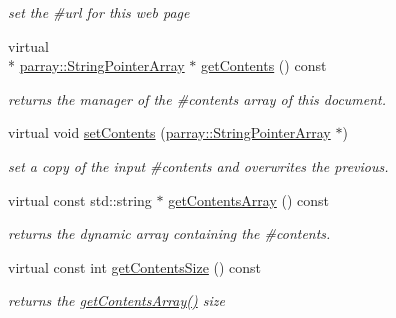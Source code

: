 \begin{DoxyCompactItemize}
\begin{DoxyCompactList}\small\item\em set the \#url for this web page \end{DoxyCompactList}\item 
\hypertarget{classdocs_1_1WebPage_ad2efbd306365a023f52c5c93caa4e638}{virtual \\*
\hyperlink{classparray_1_1StringPointerArray}{parray\-::\-String\-Pointer\-Array} $\ast$ \hyperlink{classdocs_1_1WebPage_ad2efbd306365a023f52c5c93caa4e638}{get\-Contents} () const }\label{classdocs_1_1WebPage_ad2efbd306365a023f52c5c93caa4e638}

\begin{DoxyCompactList}\small\item\em returns the manager of the \#contents array of this document. \end{DoxyCompactList}\item 
\hypertarget{classdocs_1_1WebPage_a2e09e939689a61083a5037dcc7f84419}{virtual void \hyperlink{classdocs_1_1WebPage_a2e09e939689a61083a5037dcc7f84419}{set\-Contents} (\hyperlink{classparray_1_1StringPointerArray}{parray\-::\-String\-Pointer\-Array} $\ast$)}\label{classdocs_1_1WebPage_a2e09e939689a61083a5037dcc7f84419}

\begin{DoxyCompactList}\small\item\em set a copy of the input \#contents and overwrites the previous. \end{DoxyCompactList}\item 
\hypertarget{classdocs_1_1WebPage_a7bebbf9d6f6ed1d5d37807ce14a34b2b}{virtual const std\-::string $\ast$ \hyperlink{classdocs_1_1WebPage_a7bebbf9d6f6ed1d5d37807ce14a34b2b}{get\-Contents\-Array} () const }\label{classdocs_1_1WebPage_a7bebbf9d6f6ed1d5d37807ce14a34b2b}

\begin{DoxyCompactList}\small\item\em returns the dynamic array containing the \#contents. \end{DoxyCompactList}\item 
\hypertarget{classdocs_1_1WebPage_ae58ebf97dc7208acbd7b86b267f3b699}{virtual const int \hyperlink{classdocs_1_1WebPage_ae58ebf97dc7208acbd7b86b267f3b699}{get\-Contents\-Size} () const }\label{classdocs_1_1WebPage_ae58ebf97dc7208acbd7b86b267f3b699}

\begin{DoxyCompactList}\small\item\em returns the \hyperlink{classdocs_1_1WebPage_a7bebbf9d6f6ed1d5d37807ce14a34b2b}{get\-Contents\-Array()} size \end{DoxyCompactList}\end{DoxyCompactItemize}
